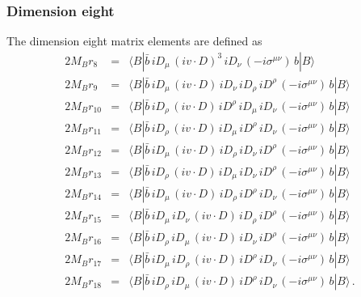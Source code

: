 \subsubsection{Dimension eight}
\vspace{-0.3cm}
The dimension eight matrix elements are defined as \cite{Mannel:2010wj}
\vspace{-0.5cm}
\begin{eqnarray}
\nonumber
2M_B r_{8} &=& \langle B | \bar b \,i   D_\mu \, (i v \cdot D)^3\, i   D_\nu
\, (-i \sigma^{\mu \nu })\,b | B \rangle \\  
\nonumber
2M_B r_{9} &=& \langle B | \bar b \,i   D_\mu \, (i v \cdot D)\, i   D_\nu
\, i   D_\rho\, i   D^\rho \,(-i \sigma^{\mu \nu })\, b | B \rangle \\  
\nonumber
2M_B r_{10} &=& \langle B | \bar b \,i   D_\rho\, (i v \cdot D)\, i
D^\rho\, i   D_\mu \, i   D_\nu  \,(-i \sigma^{\mu \nu })\, b | B \rangle \\
\nonumber
2M_B r_{11} &=& \langle B | \bar b \,i   D_\rho\, (i v \cdot D)\, i   D_\mu
\, i   D^\rho\, i   D_\nu  \,(-i \sigma^{\mu \nu })\, b | B \rangle \\  
\nonumber
2M_B r_{12} &=& \langle B | \bar b \,i   D_\mu \, (i v \cdot D)\, i
D_\rho\, i   D_\nu \, i   D^\rho \,(-i \sigma^{\mu \nu })\, b | B \rangle \\
\nonumber
2M_B r_{13} &=& \langle B | \bar b \,i   D_\rho\, (i v \cdot D)\, i   D_\mu
\, i   D_\nu \, i   D^\rho \,(-i \sigma^{\mu \nu })\, b | B \rangle \\  
\nonumber
2M_B r_{14} &=& \langle B | \bar b \,i   D_\mu \, (i v \cdot D)\, i
D_\rho\, i   D^\rho\, i   D_\nu  \,(-i \sigma^{\mu \nu })\, b | B \rangle \\
\nonumber
2M_B r_{15} &=& \langle B | \bar b \,i   D_\mu \, i   D_\nu \, (i v \cdot
D)\, i   D_\rho\, i   D^\rho \,(-i \sigma^{\mu \nu })\, b | B \rangle \nonumber\\
2M_B r_{16} &=& \langle B | \bar b \,i   D_\rho\, i   D_\mu \, (i v \cdot
D)\, i   D_\nu \, i   D^\rho \,(-i \sigma^{\mu \nu })\, b | B \rangle \nonumber\\  
2M_B r_{17} &=& \langle B | \bar b \,i   D_\mu \, i   D_\rho\, (i v \cdot
D)\, i   D^\rho\, i   D_\nu  \,(-i \sigma^{\mu \nu })\, b | B \rangle \nonumber\\  
2M_B r_{18} &=& \langle B | \bar b \,i   D_\rho\, i   D_\mu \, (i v \cdot D)\, i   D^\rho\, i   D_\nu  \,(-i \sigma^{\mu \nu })\, b | B \rangle \,.
\end{eqnarray}

